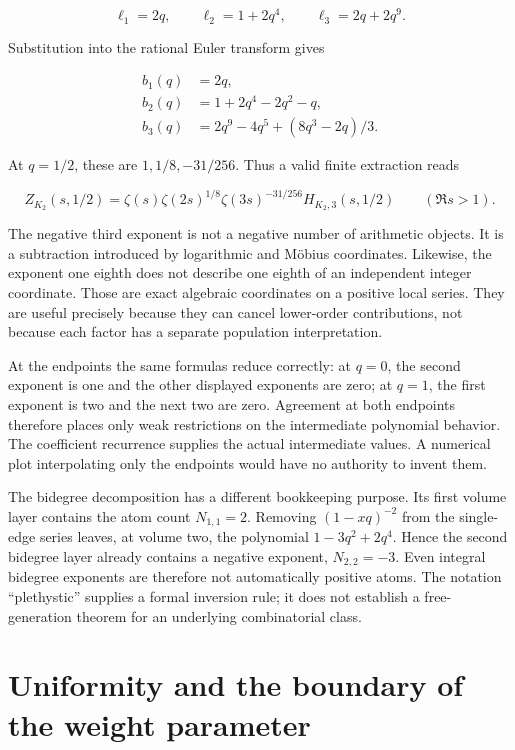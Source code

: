 \documentclass[
  11pt,
  a4paper,
]{report}
\begin{document}
\[
 \ell_1=2q,\qquad
 \ell_2=1+2q^4,\qquad
 \ell_3=2q+2q^9.
\]

Substitution into the rational Euler transform gives

\[
 \begin{aligned}
 b_1(q)&=2q,\\
 b_2(q)&=1+2q^4-2q^2-q,\\
 b_3(q)&=2q^9-4q^5+(8q^3-2q)/3.
 \end{aligned}
 \tag{6.10}
\]

At \(q=1/2\), these are \(1,1/8,-31/256\). Thus a valid finite
extraction reads

\[
 Z_{K_2}(s,1/2)=
 \zeta(s)\zeta(2s)^{1/8}\zeta(3s)^{-31/256}
 H_{K_2,3}(s,1/2)
 \qquad(\Re s>1).
 \tag{6.11}
\]

The negative third exponent is not a negative number of arithmetic
objects. It is a subtraction introduced by logarithmic and Möbius
coordinates. Likewise, the exponent one eighth does not describe one
eighth of an independent integer coordinate. Those are exact algebraic
coordinates on a positive local series. They are useful precisely
because they can cancel lower-order contributions, not because each
factor has a separate population interpretation.

At the endpoints the same formulas reduce correctly: at \(q=0\), the
second exponent is one and the other displayed exponents are zero; at
\(q=1\), the first exponent is two and the next two are zero. Agreement
at both endpoints therefore places only weak restrictions on the
intermediate polynomial behavior. The coefficient recurrence supplies
the actual intermediate values. A numerical plot interpolating only the
endpoints would have no authority to invent them.

The bidegree decomposition has a different bookkeeping purpose. Its
first volume layer contains the atom count \(N_{1,1}=2\). Removing
\((1-xq)^{-2}\) from the single-edge series leaves, at volume two, the
polynomial \(1-3q^2+2q^4\). Hence the second bidegree layer already
contains a negative exponent, \(N_{2,2}=-3\). Even integral bidegree
exponents are therefore not automatically positive atoms. The notation
``plethystic'' supplies a formal inversion rule; it does not establish a
free-generation theorem for an underlying combinatorial class.

\hypertarget{uniformity-and-the-boundary-of-the-weight-parameter}{%
\section{Uniformity and the boundary of the weight
parameter}\label{uniformity-and-the-boundary-of-the-weight-parameter}}
\end{document}
